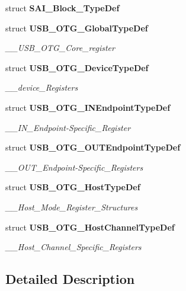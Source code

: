 \begin{DoxyCompactItemize}
struct \textbf{ S\+A\+I\+\_\+\+Block\+\_\+\+Type\+Def}
\item 
struct \textbf{ U\+S\+B\+\_\+\+O\+T\+G\+\_\+\+Global\+Type\+Def}
\begin{DoxyCompactList}\small\item\em \+\_\+\+\_\+\+U\+S\+B\+\_\+\+O\+T\+G\+\_\+\+Core\+\_\+register \end{DoxyCompactList}\item 
struct \textbf{ U\+S\+B\+\_\+\+O\+T\+G\+\_\+\+Device\+Type\+Def}
\begin{DoxyCompactList}\small\item\em \+\_\+\+\_\+device\+\_\+\+Registers \end{DoxyCompactList}\item 
struct \textbf{ U\+S\+B\+\_\+\+O\+T\+G\+\_\+\+I\+N\+Endpoint\+Type\+Def}
\begin{DoxyCompactList}\small\item\em \+\_\+\+\_\+\+I\+N\+\_\+\+Endpoint-\/\+Specific\+\_\+\+Register \end{DoxyCompactList}\item 
struct \textbf{ U\+S\+B\+\_\+\+O\+T\+G\+\_\+\+O\+U\+T\+Endpoint\+Type\+Def}
\begin{DoxyCompactList}\small\item\em \+\_\+\+\_\+\+O\+U\+T\+\_\+\+Endpoint-\/\+Specific\+\_\+\+Registers \end{DoxyCompactList}\item 
struct \textbf{ U\+S\+B\+\_\+\+O\+T\+G\+\_\+\+Host\+Type\+Def}
\begin{DoxyCompactList}\small\item\em \+\_\+\+\_\+\+Host\+\_\+\+Mode\+\_\+\+Register\+\_\+\+Structures \end{DoxyCompactList}\item 
struct \textbf{ U\+S\+B\+\_\+\+O\+T\+G\+\_\+\+Host\+Channel\+Type\+Def}
\begin{DoxyCompactList}\small\item\em \+\_\+\+\_\+\+Host\+\_\+\+Channel\+\_\+\+Specific\+\_\+\+Registers \end{DoxyCompactList}\end{DoxyCompactItemize}


\subsection{Detailed Description}
